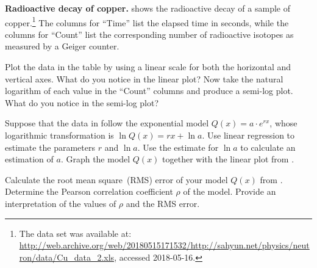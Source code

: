 \documentclass[a4paper,oneside,12pt]{article}
\begin{document}
\begin{table}[!htbp]
\centering

\caption{%
  The radioactive decay of a sample of $9.7656$ grams of copper.  The
  sample was neutron activated for $66$ minutes.  Then a Geiger
  counter was used to measure the number of radioactive isotopes after
  the elapse of the listed number of seconds.  The experiment was
  performed by Steven Sahyun at the University of Wisconsin at
  Whitewater, USA on $13$-th January~$2005$.
}
\label{tab:logarithm:copper_radioactive_decay}
\end{table}

\begin{exercise}
\textbf{Radioactive decay of copper.}
 shows the radioactive
decay of a sample of copper.\footnote{
  The data set was available at:
  \url{http://web.archive.org/web/20180515171532/http://sahyun.net/physics/neutron/data/Cu_data_2.xls},
  accessed 2018-05-16.
}
The columns for ``Time'' list the elapsed time in seconds, while the
columns for ``Count'' list the corresponding number of radioactive
isotopes as measured by a Geiger counter.
\begin{packedenum}
\item\label{subex:logarithm:copper_decay_linear_log_plots}
  Plot the data in the table by using a linear scale for both the
  horizontal and vertical axes.  What do you notice in the linear
  plot?  Now take the natural logarithm of each value in the ``Count''
  columns and produce a semi-log plot.  What do you notice in the
  semi-log plot?

\item\label{subex:logarithm:copper_decay_regression}
  Suppose that the data in
   follow the
  exponential model $Q(x) = a \cdot e^{rx}$, whose logarithmic
  transformation is $\ln Q(x) = rx + \ln a$.  Use linear regression to
  estimate the parameters $r$ and $\ln a$.  Use the estimate for
  $\ln a$ to calculate an estimation of $a$.  Graph the model $Q(x)$
  together with the linear plot
  from .

\item\label{subex:logarithm:copper_decay_RMS_error_Pearson_rho}
  Calculate the root mean square~(RMS) error of your model $Q(x)$
  from .  Determine the
  Pearson correlation coefficient $\rho$ of the model.  Provide an
  interpretation of the values of $\rho$ and the RMS error.
\end{packedenum}
\end{exercise}
\end{document}
